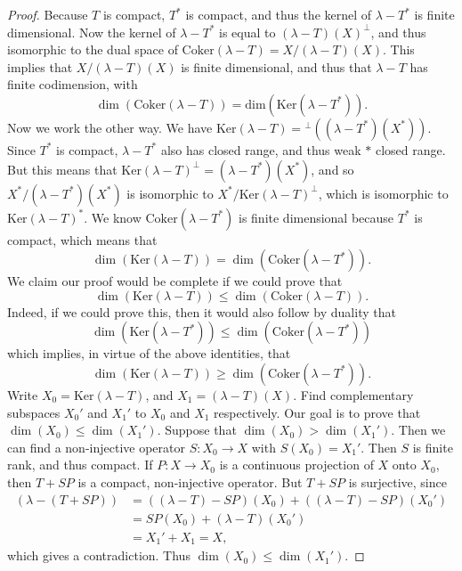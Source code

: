 \begin{proof}
    Because $T$ is compact, $T^*$ is compact, and thus the kernel of $\lambda - T^*$ is finite dimensional. Now the kernel of $\lambda - T^*$ is equal to $(\lambda - T)(X)^\perp$, and thus isomorphic to the dual space of $\text{Coker}(\lambda - T) = X / (\lambda - T)(X)$. This implies that $X / (\lambda - T)(X)$ is finite dimensional, and thus that $\lambda - T$ has finite codimension, with
    \[ \dim(\text{Coker}(\lambda - T)) = \text{dim}(\text{Ker}(\lambda - T^*)). \]
    Now we work the other way. We have $\text{Ker}(\lambda - T) = {}^\perp ((\lambda - T^*)(X^*))$. Since $T^*$ is compact, $\lambda - T^*$ also has closed range, and thus weak $*$ closed range. But this means that $\text{Ker}(\lambda - T)^\perp = (\lambda - T^*)(X^*)$, and so $X^* / (\lambda - T^*)(X^*)$ is isomorphic to $X^* / \text{Ker}(\lambda - T)^\perp$, which is isomorphic to $\text{Ker}(\lambda - T)^*$. We know $\text{Coker}(\lambda - T^*)$ is finite dimensional because $T^*$ is compact, which means that
    \[ \dim(\text{Ker}(\lambda - T)) = \dim(\text{Coker}(\lambda - T^*)). \]
    We claim our proof would be complete if we could prove that
    \[ \dim(\text{Ker}(\lambda - T)) \leq \dim(\text{Coker}(\lambda - T)). \]
    Indeed, if we could prove this, then it would also follow by duality that
    \[ \dim(\text{Ker}(\lambda - T^*)) \leq \dim(\text{Coker}(\lambda - T^*)) \]
    which implies, in virtue of the above identities, that
    \[ \dim(\text{Ker}(\lambda - T)) \geq \dim(\text{Coker}(\lambda - T^*)). \]
    Write $X_0 = \text{Ker}(\lambda - T)$, and $X_1 = (\lambda - T)(X)$. Find complementary subspaces $X_0'$ and $X_1'$ to $X_0$ and $X_1$ respectively. Our goal is to prove that $\dim(X_0) \leq \dim(X_1')$. Suppose that $\dim(X_0) > \dim(X_1')$. Then we can find a non-injective operator $S: X_0 \to X$ with $S(X_0) = X_1'$. Then $S$ is finite rank, and thus compact. If $P: X \to X_0$ is a continuous projection of $X$ onto $X_0$, then $T + SP$ is a compact, non-injective operator. But $T + SP$ is surjective, since
    \begin{align*}
        (\lambda - (T + SP)) &= ((\lambda - T) - SP)(X_0) + ((\lambda - T) - SP)(X_0')\\
        &= SP(X_0) + (\lambda - T)(X_0')\\
        &= X_1' + X_1 = X,
    \end{align*}
    which gives a contradiction. Thus $\dim(X_0) \leq \dim(X_1')$.
\end{proof}

